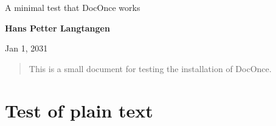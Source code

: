 \documentclass[%
oneside,                 %
final,                   %
10pt]{article}
\begin{document}

\newcommand{\exercisesection}[1]{\subsection*{#1}}








\thispagestyle{empty}

\begin{center}
{\LARGE\bf
\begin{spacing}{1.25}
A minimal test that DocOnce works
\end{spacing}
}
\end{center}


\begin{center}
{\bf Hans Petter Langtangen${}^{}$} \\ [0mm]
\end{center}

\begin{center}
\end{center}
    

\begin{center}
Jan 1, 2031
\end{center}

\vspace{1cm}

\begin{abstract}
This is a small document for testing the installation of DocOnce.

\end{abstract}

\tableofcontents


\vspace{1cm} %




\section{Test of plain text}
\end{document}
